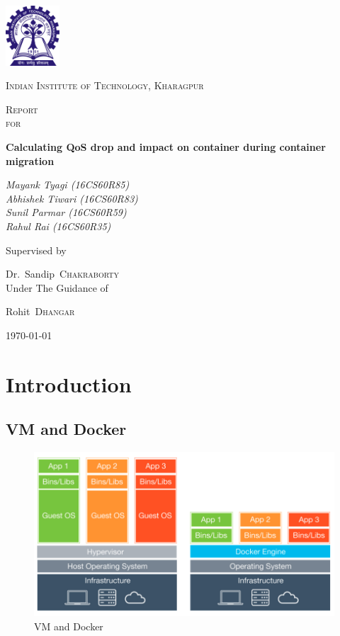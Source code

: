 \documentclass[a4paper,12pt]{article}
\begin{document}
\begin{titlepage}
  \centering
  \includegraphics[width=0.15\textwidth]{iitkgp.png}\par\vspace{1cm}
  {\scshape\LARGE Indian Institute of Technology, Kharagpur \par}
  \vspace{1cm}
  {\scshape\Large Report \\ for \par}
  \vspace{1.5cm}
  {\huge\bfseries Calculating QoS drop and impact on container during container migration\par}
  \vspace{1.5cm}
  {\large\itshape Mayank Tyagi \textnormal{(16CS60R85)} \\ Abhishek Tiwari \textnormal{(16CS60R83)}\\Sunil Parmar \textnormal{(16CS60R59)}   \\ Rahul Rai \textnormal{(16CS60R35)}\par}
  \vfill
  Supervised by\par
  Dr.~Sandip~\textsc{Chakraborty} \\
  \vfill
  Under The Guidance of\par
  Rohit~\textsc{Dhangar} \\
  \vfill
  {\today\par}
\end{titlepage}




\newpage
\tableofcontents
\newpage
\section{Introduction}
\subsection{VM and Docker}
\begin{figure}[H]
  \includegraphics[width=\textwidth]{1.png}
  \caption{VM and Docker}
  \label{fig:fig1}
\end{figure}
\end{document}
